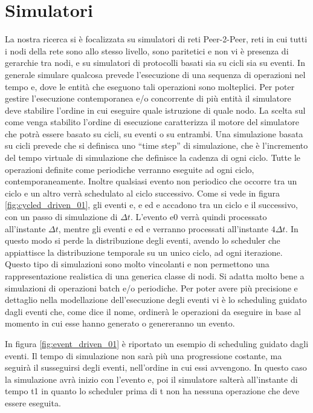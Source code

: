\section{Simulatori}
\label{sec:simulatori}
La nostra ricerca si è focalizzata su simulatori di reti Peer-2-Peer, reti in cui tutti i nodi della rete sono allo stesso livello, sono paritetici e non vi è presenza di gerarchie tra nodi, e su simulatori di protocolli basati sia su cicli sia su eventi. In generale simulare qualcosa prevede l'esecuzione di una sequenza di operazioni nel tempo e, dove le entità che eseguono tali operazioni sono molteplici. Per poter gestire l'esecuzione contemporanea e/o concorrente di più entità il simulatore deve stabilire l'ordine in cui eseguire quale istruzione di quale nodo. La scelta sul come venga stabilito l’ordine di esecuzione caratterizza il motore del simulatore che potrà essere basato su cicli, su eventi o su entrambi. Una simulazione basata su cicli prevede che si definisca uno “time step” di simulazione, che è l'incremento del tempo virtuale di simulazione che definisce la cadenza di ogni ciclo. Tutte le operazioni definite come periodiche verranno eseguite ad ogni ciclo, contemporaneamente. Inoltre qualsiasi evento non periodico che occorre tra un ciclo e un altro verrà schedulato al ciclo successivo. Come si vede in figura \ref{fig:cycled_driven_01}, gli eventi e, e ed e accadono tra un ciclo e il successivo, con un passo di simulazione di $\Delta t$. L'evento e0 verrà quindi processato all'instante $\Delta t$, mentre gli eventi e ed e verranno processati all'instante $4\Delta t$. In questo modo si perde la distribuzione degli eventi, avendo lo scheduler che appiattisce la distribuzione temporale su un unico ciclo, ad ogni iterazione. Questo tipo di simulazioni sono molto vincolanti e non permettono una rappresentazione realistica di una generica classe di nodi. Si adatta molto bene a simulazioni di operazioni batch e/o periodiche. Per poter avere più precisione e dettaglio nella modellazione dell'esecuzione degli eventi vi è lo scheduling guidato dagli eventi che, come dice il nome, ordinerà le operazioni da eseguire in base al momento in cui esse hanno generato o genereranno un evento.

In figura \ref{fig:event_driven_01} è riportato un esempio di scheduling guidato dagli eventi. Il tempo di simulazione non sarà più una progressione costante, ma seguirà il susseguirsi degli eventi, nell'ordine in cui essi avvengono. In questo caso la simulazione avrà inizio con l'evento e, poi il simulatore salterà all'instante di tempo t1 in quanto lo scheduler prima di t non ha nessuna operazione che deve essere eseguita.

